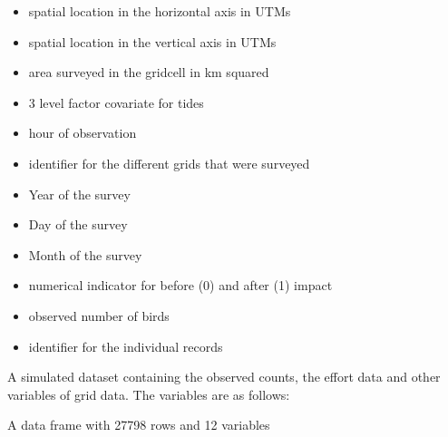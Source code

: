 \documentclass[a4paper]{book}
\begin{document}
\begin{Details}\relax
\begin{itemize}

\item {} spatial location in the horizontal axis in UTMs
\item {} spatial location in the vertical axis in UTMs
\item {} area surveyed in the gridcell in km squared
\item {} 3 level factor covariate for tides
\item {} hour of observation
\item {} identifier for the different grids that were surveyed
\item {} Year of the survey
\item {} Day of the survey
\item {} Month of the survey 
\item {} numerical indicator for before (0) and after (1) impact
\item {} observed number of birds
\item {} identifier for the individual records 

\end{itemize}

\end{Details}
%
\begin{Description}\relax
A simulated dataset containing the observed counts, the effort data and other variables of 
grid data. The variables are as follows:
\end{Description}
%
\begin{Format}
A data frame with 27798 rows and 12 variables
\end{Format}
%
\end{document}
